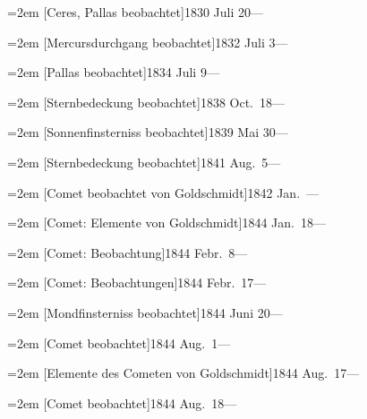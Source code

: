 \documentclass[12pt,a4paper]{article}
\begin{document}
{{{{{{{{{{\vspace{0.5mm}
\noindent\hangindent=2em
[Ceres, Pallas beobachtet]\hfill 1830 Juli 20\quad ---

\vspace{0.5mm}
\noindent\hangindent=2em
[Mercursdurchgang beobachtet]\hfill 1832 Juli 3\quad ---

\vspace{0.5mm}
\noindent\hangindent=2em
[Pallas beobachtet]\hfill 1834 Juli 9\quad ---

\vspace{0.5mm}
\noindent\hangindent=2em
[Sternbedeckung beobachtet]\hfill 1838 Oct.\ 18\quad ---

\vspace{0.5mm}
\noindent\hangindent=2em
[Sonnenfinsterniss beobachtet]\hfill 1839 Mai 30\quad ---

\vspace{0.5mm}
\noindent\hangindent=2em
[Sternbedeckung beobachtet]\hfill 1841 Aug.\ 5\quad ---

\vspace{0.5mm}
\noindent\hangindent=2em
[Comet beobachtet von Goldschmidt]\hfill 1842 Jan.\ ---

\vspace{0.5mm}
\noindent\hangindent=2em
[Comet: Elemente von Goldschmidt]\hfill 1844 Jan.\ 18\quad ---

\vspace{0.5mm}
\noindent\hangindent=2em
[Comet: Beobachtung]\hfill 1844 Febr.\ 8\quad ---

\vspace{0.5mm}
\noindent\hangindent=2em
[Comet: Beobachtungen]\hfill 1844 Febr.\ 17\quad ---

\vspace{0.5mm}
\noindent\hangindent=2em
[Mondfinsterniss beobachtet]\hfill 1844 Juni 20\quad ---

\vspace{0.5mm}
\noindent\hangindent=2em
[Comet beobachtet]\hfill 1844 Aug.\ 1\quad ---

\vspace{0.5mm}
\noindent\hangindent=2em
[Elemente des Cometen von Goldschmidt]\hfill 1844 Aug.\ 17\quad ---

\vspace{0.5mm}
\noindent\hangindent=2em
[Comet beobachtet]\hfill 1844 Aug.\ 18\quad ---

}}}}}}}}}}
\end{document}
